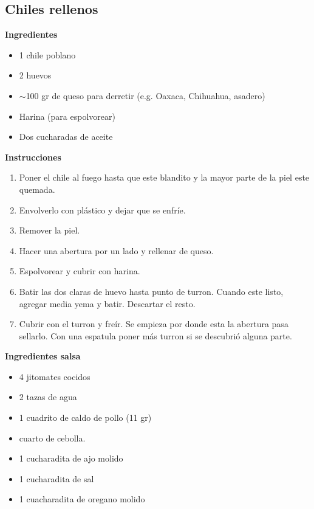 \subsection{Chiles rellenos}
\textbf{Ingredientes}
\begin{itemize}
\item 1 chile poblano
\item 2 huevos
\item $\sim$100 gr de queso para derretir (e.g. Oaxaca, Chihuahua, asadero)
\item Harina (para espolvorear)
\item Dos cucharadas de aceite
\end{itemize}

\textbf{Instrucciones}
\begin{enumerate}
\item Poner el chile al fuego hasta que este blandito y la mayor parte de la piel este quemada.
\item Envolverlo con pl\'astico y dejar que se enfr\'ie.
\item Remover la piel.
\item Hacer una abertura por un lado y rellenar de queso.
\item Espolvorear y cubrir con harina.
\item Batir las dos claras de huevo hasta punto de turron. Cuando este listo, agregar media yema y batir. Descartar el resto.
\item Cubrir con el turron y fre\'ir. Se empieza por donde esta la abertura pasa sellarlo. Con una espatula poner m\'as turron si se descubri\'o alguna parte.
\end{enumerate}

\textbf{Ingredientes salsa}
\begin{itemize}
\item 4 jitomates cocidos
\item 2 tazas de agua
\item 1 cuadrito de caldo de pollo (11 gr)
\item {} cuarto de cebolla.
\item 1 cucharadita de ajo molido
\item 1 cucharadita de sal
\item 1 cuacharadita de oregano molido
\end{itemize}
